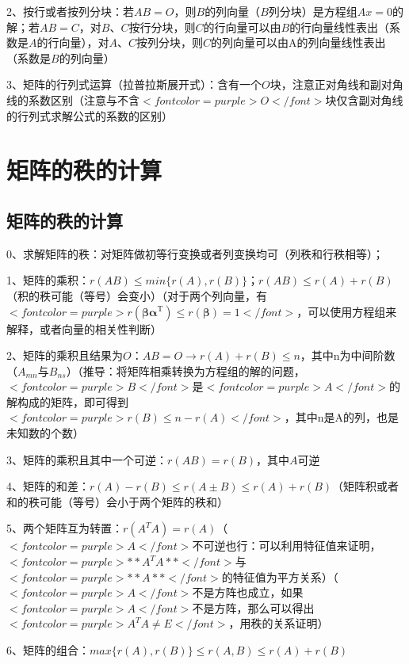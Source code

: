 2、按行或者按列分块：若$ AB=O $，则$ B $的列向量（$ B $列分块）是方程组$ Ax=0 $的解；若$ AB=C $，对$ B、C $按行分块，则$ C $的行向量可以由$ B $的行向量线性表出（系数是$ A $的行向量），对$ A、C $按列分块，则$ C $的列向量可以由A的列向量线性表出（系数是$ B $的列向量）

3、矩阵的行列式运算（拉普拉斯展开式）：含有一个$ O $块，注意正对角线和副对角线的系数区别（注意与不含$ <font color=purple>O</font> $块仅含副对角线的行列式求解公式的系数的区别）

\section{矩阵的秩的计算}



\subsection{矩阵的秩的计算}

0、求解矩阵的秩：对矩阵做初等行变换或者列变换均可（列秩和行秩相等）；

1、矩阵的乘积：$ r(AB) \leqslant min\{r(A),r(B)\} $；$ r(AB) \leqslant r(A)+r(B) $（积的秩可能（等号）会变小）（对于两个列向量，有$ <font color=purple>r\left(\boldsymbol{\beta} \boldsymbol{\alpha}^{\mathrm{T}}\right) \leqslant r(\boldsymbol{\beta})=1</font> $，可以使用方程组来解释，或者向量的相关性判断）

2、矩阵的乘积且结果为$ O $：$ AB=O \rightarrow r(A)+r(B) \leqslant n $，其中n为中间阶数（$ A_{mn} $与$ B_{ns} $）（推导：将矩阵相乘转换为方程组的解的问题，$ <font color=purple>B</font> $是$ <font color=purple>A</font> $的解构成的矩阵，即可得到$ <font color=purple>r(B)\leqslant n - r(A) </font> $，其中n是A的列，也是未知数的个数）

3、矩阵的乘积且其中一个可逆：$ r(AB)=r(B) $，其中$ A $可逆

4、矩阵的和差：$ r(A)-r(B)\leqslant r(A\pm B) \leqslant r(A)+r(B) $（矩阵积或者和的秩可能（等号）会小于两个矩阵的秩和）

5、两个矩阵互为转置：$ r(A^TA)= r(A) $（$ <font color=purple>A</font> $不可逆也行：可以利用特征值来证明，$ <font color=purple>**A^TA**</font> $与$ <font color=purple>**A**</font> $的特征值为平方关系）（$ <font color=purple>A</font> $不是方阵也成立，如果$ <font color=purple>A</font> $不是方阵，那么可以得出$ <font color=purple>A^TA \ne E</font> $，用秩的关系证明）

6、矩阵的组合：$ max\{r(A),r(B)\}  \leqslant r(A,B) \leqslant r(A)+r(B) $

